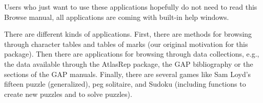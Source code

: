 \documentclass[a4paper,11pt]{report}
\begin{document}
{{{ Users who just want to use these applications hopefully do not need to read
this \textsf{Browse} manual, all applications are coming with built-in help windows. 

 There are different kinds of applications. First, there are methods for
browsing through character tables and tables of marks (our original motivation
for this package). Then there are applications for browsing through data
collections, e.g., the data available through the \textsf{AtlasRep} package, the \textsf{GAP} bibliography or the sections of the \textsf{GAP} manuals. Finally, there are several games like Sam Loyd's fifteen puzzle
(generalized), peg solitaire, and Sudoku (including functions to create new
puzzles and to solve puzzles). }

 }

 }

 
\end{document}
